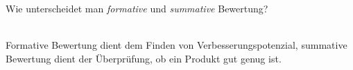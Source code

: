 \begin{exercise}
  Wie unterscheidet man \textit{formative} und \textit{summative} Bewertung?
  \\\\
\end{exercise}
Formative Bewertung dient dem Finden von Verbesserungspotenzial, summative Bewertung dient der Überprüfung, ob ein Produkt gut genug ist.
